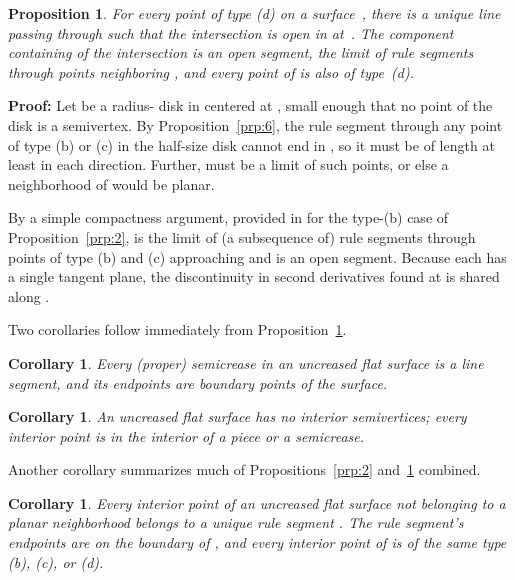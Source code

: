 \documentclass[11pt,letterpaper]{article}
\newtheorem{proposition}[theorem]{Proposition}
\newtheorem{corollary}[theorem]{Corollary}
\newenvironment{proof}{\noindent\textbf{Proof: }\ignorespaces}
  {\hspace*{\fill}\medskip}
\begin{document}
\begin{proposition}\label{prp:3}
  For every point  of type (d) on a surface~,
  there is a unique line  passing through 
  such that the intersection  is open in  at~.
  The component  containing  of the
  intersection  is an open segment,
  the limit of rule segments through points neighboring ,
  and every point of  is also of type~(d).
\end{proposition}
\begin{proof}
  Let  be a radius- disk in  centered at ,
  small enough that no point of the disk is a semivertex.
  By Proposition~\ref{prp:6}, the rule segment
  through any point  of type (b) or (c) in the
  half-size disk  cannot end in ,
  so it must be of length at least  in each direction.
  Further,  must be a limit of such points,
  or else a neighborhood of  would be planar.

  By a simple compactness argument, provided in \cite{Spivak-1979} for the
  type-(b) case of Proposition~\ref{prp:2},  is the limit of (a
  subsequence of) rule segments  through points  of type (b)
  and (c) approaching  and is an open segment.  Because each 
  has a single tangent plane, the discontinuity in second derivatives
  found at  is shared along .
\end{proof}

Two corollaries follow immediately from Proposition~\ref{prp:3}.

\begin{corollary}\label{cory:2}
  Every (proper) semicrease in an uncreased flat surface is a line segment,
  and its endpoints are boundary points of the surface.
\end{corollary}

\begin{corollary}\label{cory:3}
  An uncreased flat surface has no interior semivertices;
  every interior point is in the interior of a  piece or a semicrease.
\end{corollary}

Another corollary summarizes much of Propositions~\ref{prp:2}
and~\ref{prp:3} combined.

\begin{corollary}\label{cory:1}
  Every interior point  of an uncreased flat surface  not
  belonging to a planar neighborhood belongs to a unique rule segment
  .  The rule segment's endpoints are on the boundary of , and
  every interior point of  is of the same type (b), (c), or (d).
\end{corollary}
\end{document}
